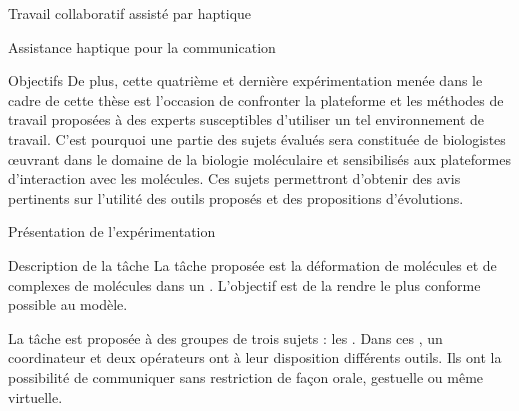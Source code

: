 \documentclass[myfrancais,ngerman,english,frenchb]{mythesis}
\begin{document}
\begin{mychapter}{Travail collaboratif assisté par haptique}
\begin{mysection}{Assistance haptique pour la communication}
\begin{mysubsection}{Objectifs}
				De plus, cette quatrième et dernière expérimentation menée dans le cadre de cette thèse est l'occasion de confronter la plateforme et les méthodes de travail proposées à des experts susceptibles d'utiliser un tel environnement de travail.
				C'est pourquoi une partie des sujets évalués sera constituée de biologistes œuvrant dans le domaine de la biologie moléculaire et sensibilisés aux plateformes d'interaction avec les molécules.
				Ces sujets permettront d'obtenir des avis pertinents sur l'utilité des outils proposés et des propositions d'évolutions.
			\end{mysubsection}
		\end{mysection}
		\begin{mysection}{Présentation de l'expérimentation}
			\begin{mysubsection}{Description de la tâche}
				La tâche proposée est la déformation de molécules et de complexes de molécules dans un .
				L'objectif est de la rendre le plus conforme possible au modèle.

				La tâche est proposée à des groupes de trois sujets : les .
				Dans ces , un \og coordinateur \fg et deux \og opérateurs \fg ont à leur disposition différents outils.
				Ils ont la possibilité de communiquer sans restriction de façon orale, gestuelle ou même virtuelle.


\end{mysubsection}
\end{mysection}
\end{mychapter}
\end{document}
